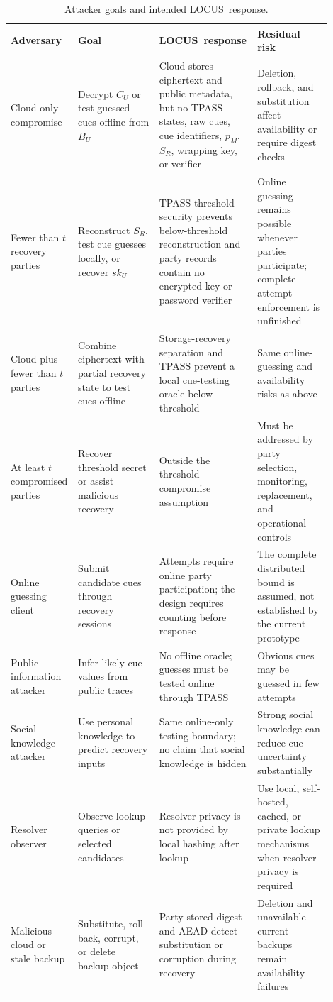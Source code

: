 \documentclass[sigconf,anonymous]{acmart}
\newcommand{\LOCUS}{\textsf{LOCUS}}
\begin{document}
\begin{table}[t]
\centering
\caption{Attacker goals and intended \LOCUS\ response.}
\label{tab:attacker-goals}
\footnotesize
\begin{tabular}{p{0.18\linewidth}p{0.25\linewidth}p{0.24\linewidth}p{0.23\linewidth}}
\toprule
\textbf{Adversary} & \textbf{Goal} & \textbf{\LOCUS\ response} & \textbf{Residual risk} \\
\midrule
Cloud-only compromise & Decrypt \(C_U\) or test guessed cues offline from \(B_U\) & Cloud stores ciphertext and public metadata, but no TPASS states, raw cues, cue identifiers, \(p_M\), \(S_R\), wrapping key, or verifier & Deletion, rollback, and substitution affect availability or require digest checks \\
\addlinespace
Fewer than \(t\) recovery parties & Reconstruct \(S_R\), test cue guesses locally, or recover \(sk_U\) & TPASS threshold security prevents below-threshold reconstruction and party records contain no encrypted key or password verifier & Online guessing remains possible whenever parties participate; complete attempt enforcement is unfinished \\
\addlinespace
Cloud plus fewer than \(t\) parties & Combine ciphertext with partial recovery state to test cues offline & Storage-recovery separation and TPASS prevent a local cue-testing oracle below threshold & Same online-guessing and availability risks as above \\
\addlinespace
At least \(t\) compromised parties & Recover threshold secret or assist malicious recovery & Outside the threshold-compromise assumption & Must be addressed by party selection, monitoring, replacement, and operational controls \\
\addlinespace
Online guessing client & Submit candidate cues through recovery sessions & Attempts require online party participation; the design requires counting before response & The complete distributed bound is assumed, not established by the current prototype \\
\addlinespace
Public-information attacker & Infer likely cue values from public traces & No offline oracle; guesses must be tested online through TPASS & Obvious cues may be guessed in few attempts \\
\addlinespace
Social-knowledge attacker & Use personal knowledge to predict recovery inputs & Same online-only testing boundary; no claim that social knowledge is hidden & Strong social knowledge can reduce cue uncertainty substantially \\
\addlinespace
Resolver observer & Observe lookup queries or selected candidates & Resolver privacy is not provided by local hashing after lookup & Use local, self-hosted, cached, or private lookup mechanisms when resolver privacy is required \\
\addlinespace
Malicious cloud or stale backup & Substitute, roll back, corrupt, or delete backup object & Party-stored digest and AEAD detect substitution or corruption during recovery & Deletion and unavailable current backups remain availability failures \\
\bottomrule
\end{tabular}
\end{table}
\end{document}
